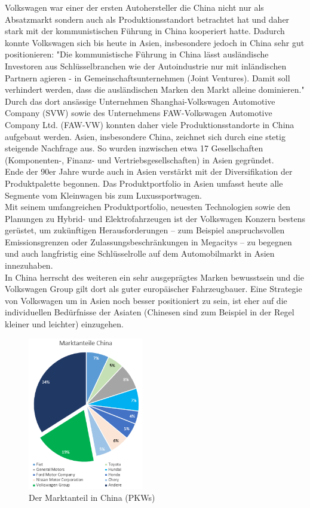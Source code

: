 \documentclass[12pt]{article}
\begin{document}
Volkswagen war einer der ersten Autohersteller die China nicht nur als Absatzmarkt sondern auch als Produktionsstandort betrachtet hat und daher stark mit der kommunistischen Führung in China kooperiert hatte. Dadurch konnte Volkswagen sich bis heute in Asien, insbesondere jedoch in China sehr gut positionieren: 
"Die kommunistische Führung in China lässt ausländische Investoren aus Schlüsselbranchen wie der Autoindustrie nur mit inländischen Partnern agieren - in Gemeinschaftsunternehmen (Joint Ventures). Damit soll verhindert werden, dass die ausländischen Marken den Markt alleine dominieren." \cite{vwamstrategiechina2}\\
Durch das dort ansässige Unternehmen Shanghai-Volkswagen Automotive Company (SVW) sowie des Unternehmens FAW-Volkswagen Automotive Company Ltd. (FAW-VW) konnten daher viele Produktionsstandorte in China aufgebaut werden.
Asien, insbesondere China, zeichnet sich durch eine stetig steigende Nachfrage aus. So wurden inzwischen etwa 17 Gesellschaften (Komponenten-, Finanz- und Vertriebsgesellschaften) in Asien gegründet. \\
Ende der 90er Jahre wurde auch in Asien verstärkt mit der Diversifikation der Produktpalette begonnen. Das  Produktportfolio in Asien umfasst heute alle Segmente vom Kleinwagen bis zum Luxussportwagen.
\\
Mit seinem umfangreichen Produktportfolio, neuesten Technologien sowie den Planungen zu Hybrid- und Elektrofahrzeugen ist der Volkswagen Konzern bestens gerüstet, um zukünftigen Herausforderungen – zum Beispiel anspruchsvollen Emissionsgrenzen oder Zulassungsbeschränkungen in Megacitys – zu begegnen und auch langfristig eine Schlüsselrolle auf dem Automobilmarkt in Asien innezuhaben. \\
In China herrscht des weiteren ein sehr ausgeprägtes Marken bewusstsein und die Volkswagen Group gilt dort als guter europäischer Fahrzeugbauer.  Eine Strategie von Volkswagen um in Asien noch besser positioniert zu sein, ist eher auf die individuellen Bedürfnisse der Asiaten (Chinesen sind zum Beispiel in der Regel kleiner und leichter) einzugehen. \cite{vwamstrategiechina}
\begin{figure}[!h]
\centering
\includegraphics[width=0.45\textwidth]{images/mach}
\caption{Der Marktanteil in China (PKWs)}
\label{fig:marktchina}
\end{figure}\FloatBarrier
\end{document}
